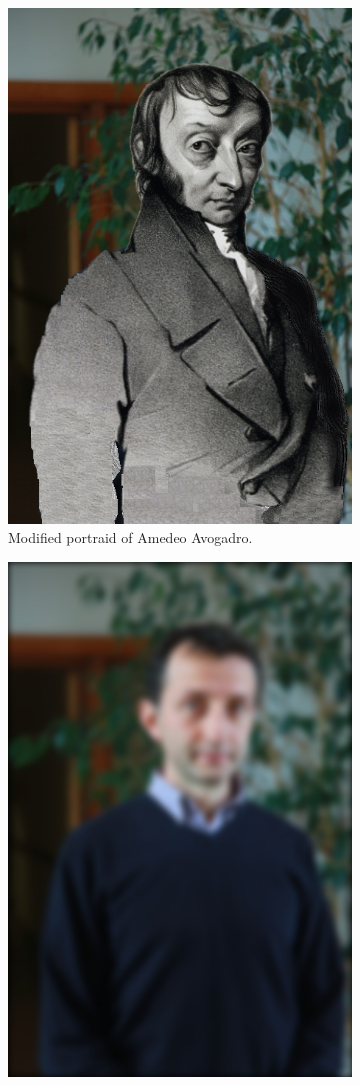 \documentclass{article}
\begin{document}
\begin{figure}[!htb]
\begin{subfigure}{.4\textwidth}
  \includegraphics[width=.8\textwidth]{avogadro.png}
  \caption{Modified portraid of Amedeo Avogadro.}
\end{subfigure}
\begin{subfigure}{.4\textwidth}
  \centering
  \includegraphics[width=.8\textwidth]{low_frequencies_yyemez.jpg}

\end{subfigure}
\end{figure}
\end{document}

